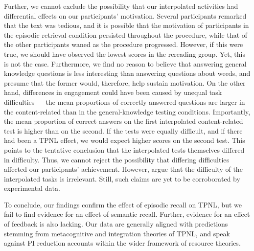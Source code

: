 \documentclass[../main.tex]{subfiles}
\begin{document}
Further, we cannot exclude the possibility that our interpolated activities 
had differential effects on our participants’ motivation. Several  
participants remarked that the text was tedious, and it is possible that the 
motivation of participants in the episodic retrieval condition persisted 
throughout the procedure, while that of the other participants waned as the 
procedure progressed. However, if this were true, we should have observed 
the lowest scores in the rereading group. Yet, this is not the case. 
Furthermore, we find no reason to believe that answering general knowledge 
questions is less interesting than answering questions about weeds, and 
presume that the former would, therefore, help sustain motivation. On the 
other hand, differences in engagement could have been caused by unequal task 
difficulties — the mean proportions of correctly answered questions are 
larger in the content-related than in the general-knowledge testing 
conditions. Importantly, the mean proportion of correct answers on the first 
interpolated content-related test is higher than on the second. If the tests 
were equally difficult, and if there had been a TPNL effect, we would expect 
higher scores on the second test. This points to the tentative conclusion 
that the interpolated tests themselves differed in difficulty. Thus, we 
cannot reject the possibility that differing difficulties affected our 
participants’ achievement. However, \citet{divisRetrievalSpeedsContext2014} 
argue that the difficulty of the interpolated tasks is irrelevant. Still, 
such claims are yet to be corroborated by experimental data.

To conclude, our findings confirm the effect of episodic recall on TPNL, but 
we fail to find evidence for an effect of semantic recall. Further, evidence 
for an effect of feedback is also lacking. Our data are generally aligned 
with predictions stemming from metacognitive and integration theories of 
TPNL, and speak against PI reduction accounts within the wider framework of 
resource theories.
\end{document}
